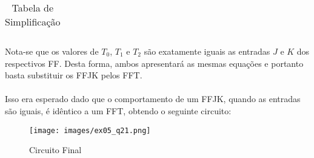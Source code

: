 \documentclass{article}
\begin{document}
\begin{resolution}
\begin{table}[H]
\begin{tabular}[]{cccc|cc|cc|cc|ccc|ccc}
            \end{tabular}\caption{Tabela de Simplificação}
        \end{table}\noindent
        Nota-se que os valores de $T_0$, $T_1$ e $T_2$ são exatamente iguais as entradas $J$ e $K$ dos respectivos FF. Desta forma, ambos apresentará as mesmas equações e portanto basta substituir os FFJK pelos FFT.\\\\
        Isso era esperado dado que o comportamento de um FFJK, quando as entradas são iguais, é idêntico a um FFT, obtendo o seguinte circuito:
        \begin{figure}[H]
            \centering
            \texttt{[image: images/ex05\_q21.png]}
            \caption{Circuito Final}
        \end{figure}
    \end{resolution}

\newpage
\end{document}

